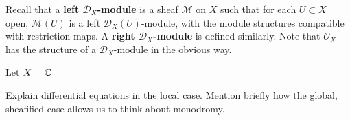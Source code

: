 \begin{definition}
    Recall that a \textbf{left $\mathscr{D}_X$-module} is a sheaf $\mathcal{M}$ on $X$ such
    that for each $U\subset X$ open, $\mathcal{M}(U)$ is a left $\mathscr{D}_X(U)$-module,
    with the module structures compatible with restriction maps. A \textbf{right $\mathscr{D}_X$-module}
    is defined similarly. Note that $\mathcal{O}_X$ has the structure of a $\mathscr{D}_X$-module
    in the obvious way.
\end{definition}

\begin{example}
    Let $X=\mathbb{C}$ 
\end{example}

\begin{example}
    Explain differential equations in the local case. Mention briefly how the global, sheafified
    case allows us to think about monodromy.
\end{example}


